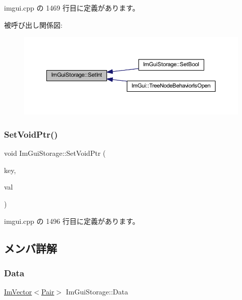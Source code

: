  imgui.\+cpp の 1469 行目に定義があります。

被呼び出し関係図\+:\nopagebreak
\begin{figure}[H]
\begin{center}
\leavevmode
\includegraphics[width=350pt]{struct_im_gui_storage_af83975ca841a9bd0e06a6ea0a41bf159_icgraph}
\end{center}
\end{figure}
\mbox{\label{struct_im_gui_storage_a55f840086b3ec9cf63c67f02d159204a}} 
\subsubsection{\texorpdfstring{Set\+Void\+Ptr()}{SetVoidPtr()}}
{\footnotesize\ttfamily void Im\+Gui\+Storage\+::\+Set\+Void\+Ptr (\begin{DoxyParamCaption}\item[{\mbox{\hyperlink{imgui_8h_a1785c9b6f4e16406764a85f32582236f}{Im\+Gui\+ID}}}]{key,  }\item[{void $\ast$}]{val }\end{DoxyParamCaption})}



 imgui.\+cpp の 1496 行目に定義があります。



\subsection{メンバ詳解}
\mbox{\label{struct_im_gui_storage_aab0b9789fac598a34c500459259fde42}} 
\subsubsection{\texorpdfstring{Data}{Data}}
{\footnotesize\ttfamily \mbox{\hyperlink{class_im_vector}{Im\+Vector}}$<$\mbox{\hyperlink{struct_im_gui_storage_1_1_pair}{Pair}}$>$ Im\+Gui\+Storage\+::\+Data}



